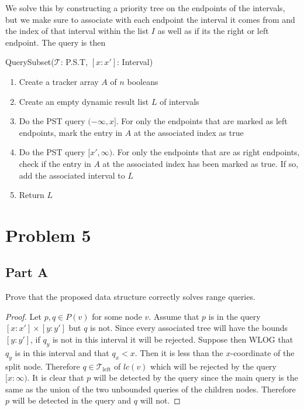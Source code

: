 \documentclass[12pt]{extarticle}
\begin{document}
\begin{solution}
    We solve this by constructing a priority tree on the endpoints of the intervals, but we make sure to associate with each endpoint the interval it comes from and the index of that interval within the list $I$ as well as if its the right or left endpoint. The query is then 
    \begin{algorithm}[H]
        \caption{QuerySubset($\mathcal{T}$: P.S.T, $[x : x']$: Interval)}
        \begin{enumerate}
            \item Create a tracker array $A$ of $n$ booleans
            \item Create an empty dynamic result list $L$ of intervals
            \item Do the PST query $(-\infty, x]$. For only the endpoints that are marked as left endpoints, mark the entry in $A$ at the associated index as true
            \item Do the PST query $[x', \infty)$. For only the endpoints that are as right endpoints, check if the entry in $A$ at the associated index has been marked as true. If so, add the associated interval to $L$
            \item Return $L$
        \end{enumerate}
    \end{algorithm}
\end{solution}

\section*{Problem 5}
\subsection*{Part A}
Prove that the proposed data structure correctly solves range queries.

\begin{proof}
    Let $p,q \in P(v)$ for some node $v$. Assume that $p$ is in the query $[x : x'] \times [y : y']$ but $q$ is not. Since every associated tree will have the bounds $[y : y']$, if $q_y$ is not in this interval it will be rejected. Suppose then WLOG that $q_y$ is in this interval and that $q_x < x$. Then it is less than the $x$-coordinate of the split node. Therefore $q \in \mathcal{T}_{\text{left}}$ of $lc(v)$ which will be rejected by the query $[x : \infty)$. It is clear that $p$ will be detected by the query since the main query is the same as the union of the two unbounded queries of the children nodes. Therefore $p$ will be detected in the query and $q$ will not.
\end{proof}
\end{document}
